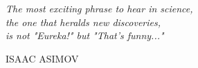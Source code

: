 \cleardoublepage


\thispagestyle{empty}
\null\vfill

\settowidth{}
\begin{center}
\parbox{\longest}{%
\raggedright{\Large\itshape%
The most exciting phrase to hear in science,\\
the one that heralds new discoveries,\\
is not "Eureka!" but "That's funny..."\par\bigskip
}
\raggedleft\large\MakeUppercase{Isaac Asimov}\par%
}
\end{center}
\vfill\vfill







